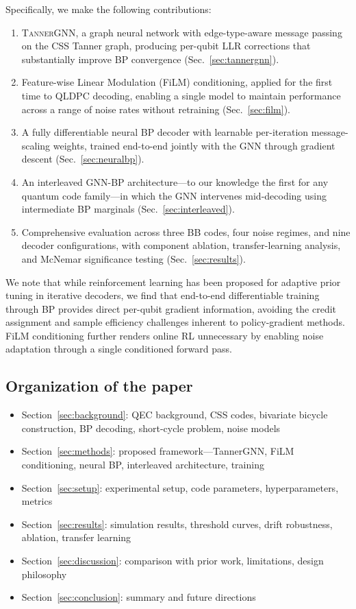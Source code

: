 \documentclass[a4paper,twocolumn,11pt,unpublished,nopdfoutputerror]{quantumarticle}
\begin{document}
Specifically, we make the following contributions:
\begin{enumerate}[leftmargin=*,topsep=2pt,itemsep=2pt]
\item \textsc{TannerGNN}, a graph neural network with edge-type-aware message passing on the CSS Tanner graph, producing per-qubit LLR corrections that substantially improve BP convergence (Sec.~\ref{sec:tannergnn}).

\item Feature-wise Linear Modulation (FiLM) conditioning, applied for the first time to QLDPC decoding, enabling a single model to maintain performance across a range of noise rates without retraining (Sec.~\ref{sec:film}).

\item A fully differentiable neural BP decoder with learnable per-iteration message-scaling weights, trained end-to-end jointly with the GNN through gradient descent (Sec.~\ref{sec:neuralbp}).

\item An interleaved GNN-BP architecture---to our knowledge the first for any quantum code family---in which the GNN intervenes mid-decoding using intermediate BP marginals (Sec.~\ref{sec:interleaved}).

\item Comprehensive evaluation across three BB codes, four noise regimes, and nine decoder configurations, with component ablation, transfer-learning analysis, and McNemar significance testing (Sec.~\ref{sec:results}).
\end{enumerate}

We note that while reinforcement learning has been proposed for adaptive prior tuning in iterative decoders, we find that end-to-end differentiable training through BP provides direct per-qubit gradient information, avoiding the credit assignment and sample efficiency challenges inherent to policy-gradient methods. FiLM conditioning further renders online RL unnecessary by enabling noise adaptation through a single conditioned forward pass.

\subsection{Organization of the paper}
\begin{itemize}
  \item Section~\ref{sec:background}: QEC background, CSS codes, bivariate bicycle construction, BP decoding, short-cycle problem, noise models
  \item Section~\ref{sec:methods}: proposed framework---TannerGNN, FiLM conditioning, neural BP, interleaved architecture, training
  \item Section~\ref{sec:setup}: experimental setup, code parameters, hyperparameters, metrics
  \item Section~\ref{sec:results}: simulation results, threshold curves, drift robustness, ablation, transfer learning
  \item Section~\ref{sec:discussion}: comparison with prior work, limitations, design philosophy
  \item Section~\ref{sec:conclusion}: summary and future directions
\end{itemize}
\end{document}

